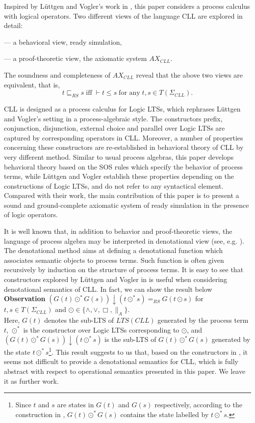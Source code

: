 \documentclass{elsarticle}
\theoremstyle{plain}
\theoremstyle{definition}
\begin{document}
Inspired by L{\"u}ttgen and Vogler's work in \cite{Luttgen10}, this paper considers a process calculus with logical operators. Two different views of the language CLL are explored in detail:

\noindent --- a behavioral view, ready simulation,

\noindent --- a proof-theoretic view, the axiomatic system $AX_{CLL}$.

The soundness and completeness of $AX_{CLL}$ reveal that the above two views are equivalent, that is,
\[t\sqsubseteq_{RS} s\;\text{iff}\;\vdash t\leqslant s\;\text{for any}\;t,s \in T(\Sigma_{CLL}).\]

CLL is designed as a process calculus for Logic LTSs, which rephrases L\"{u}ttgen and Vogler's setting in a process-algebraic style.
The constructors prefix, conjunction, disjunction, external choice and parallel over Logic LTSs are captured by corresponding operators in CLL.
Moreover, a number of properties concerning these constructors are re-established in behavioral theory of CLL by very different method.
Similar to usual process algebras, this paper develops behavioral theory based on the SOS rules which specify the behavior of process terms, while L{\"u}ttgen and Vogler establish these properties depending on the constructions of Logic LTSs, and do not refer to any syntactical element.
Compared with their work, the main contribution of this paper is to present a sound and ground-complete axiomatic system of ready simulation in the presence of logic operators.

It is well known that, in addition to behavior and proof-theoretic views, the language of process algebra may be interpreted in denotational view (see, e.g. \cite{Hennessy88}).
The denotational method aims at defining a denotational function which associates semantic objects to process terms.
Such function is often given recursively by induction on the structure of process terms.
It is easy to see that constructors explored by L{\"u}ttgen and Vogler in \cite{Luttgen10} is useful when considering denotational semantics of CLL.
In fact, we can show the result below\\

\noindent \textbf{Observation} $(G(t) \odot^* G(s))\downarrow (t\odot^* s) =_{RS} G(t\odot s)$ for $t,s \in T(\Sigma_{CLL})$ and $\odot \in \{\wedge,\vee,\Box,\parallel_A\}$.\\

Here, $G(t)$ denotes the sub-LTS of $LTS(CLL)$ generated by the process term $t$, $\odot^*$ is the constructor over Logic LTSs corresponding to $\odot$, and $(G(t) \odot^* G(s))\downarrow (t\odot^* s)$ is the sub-LTS of $G(t) \odot^* G(s)$ generated by the state $t\odot^* s$\footnote{Since $t$ and $s$ are states in $G(t)$ and $G(s)$ respectively, according to the construction in \cite{Luttgen10}, $G(t) \odot^* G(s)$ contains the state labelled by $t\odot^* s$.}.
This result suggests to us that, based on the constructors in \cite{Luttgen10}, it seems not difficult to provide a denotational semantics for CLL, which is fully abstract with respect to operational semantics presented in this paper.
We leave it as further work.
\end{document}
